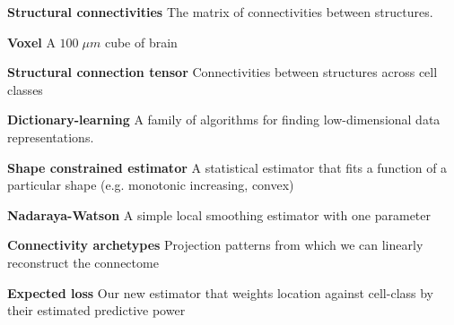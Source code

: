 \documentclass[NETN,manuscript]{stjour-new}
\begin{document}
\textbf{Structural connectivities} The matrix of connectivities between structures.

\textbf{Voxel} A $100 \; \mu m$ cube of brain

\textbf{Structural connection tensor}  Connectivities between structures across cell classes

\textbf{Dictionary-learning} A family of algorithms for finding low-dimensional data representations.

\textbf{Shape constrained estimator} A statistical estimator that fits a function of a particular shape (e.g. monotonic increasing, convex)

\textbf{Nadaraya-Watson} A simple local smoothing estimator with one parameter

\textbf{Connectivity archetypes} Projection patterns from which we can linearly reconstruct the connectome

 \textbf{Expected loss} Our new estimator that weights location against cell-class by their estimated predictive power
 


\end{document}
